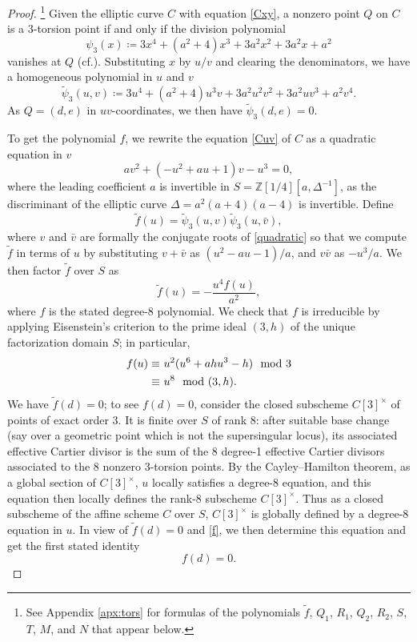 \documentclass{gtpart}
\theoremstyle{definition}
\theoremstyle{remark}
\newcommand{\mb}[1]{\mathbb{#1}}
\newcommand{\cf}{cf.\thinspace}
\newcommand{\BZ}{{\mb Z}}
\newcommand{\Tf}{\widetilde{f}}
\newcommand{\TP}{\widetilde{\psi}}
\newcommand{\md}{~~{\rm mod}~}
\begin{document}
\begin{proof}
 \footnote{See Appendix \ref{apx:tors} for formulas of the polynomials $\Tf$, $Q_1$, $R_1$, $Q_2$, $R_2$, $S$, $T$, $M$, and $N$ that appear below.  }
 Given the elliptic curve $C$ with equation \eqref{Cxy}, a nonzero point $Q$ on $C$ is a 3-torsion point if and only if the division polynomial 
 \[
  \psi_3 (x) \coloneqq 3x^4 + (a^2 + 4) x^3 + 3a^2 x^2 + 3a^2 x + a^2 
 \]
 vanishes at $Q$ (\cf \cite[Exercise 3.7f]{AEC}).  Substituting $x$ by $u/v$ and clearing the denominators, we have a homogeneous polynomial in $u$ and $v$ 
 \[
  \TP_3(u,v) \coloneqq 3u^4 + (a^2 + 4) u^3 v + 3a^2 u^2 v^2 + 3a^2 u v^3 + a^2 v^4.  
 \]
 As $Q = (d,e)$ in $uv$-coordinates, we then have $\TP_3(d,e) = 0$.  

 To get the polynomial $f$, we rewrite the equation \eqref{Cuv} of $C$ as a quadratic equation in $v$ 
 \begin{equation}
 \label{quadratic}
  a v^2 + (-u^2 + a u + 1) v - u^3 = 0, 
 \end{equation}
 where the leading coefficient $a$ is invertible in $S = \BZ [1/4] [a, \Delta^{-1}]$, as the discriminant of the elliptic curve $\Delta = a^2 (a + 4) (a - 4)$ is invertible.  
 Define 
 \[
  \Tf(u) = \TP_3(u,v) \TP_3(u,\bar{v}), 
 \]
 where $v$ and $\bar{v}$ are formally the conjugate roots of \eqref{quadratic} 
 so that we compute $\Tf$ in terms of $u$ by substituting $v + \bar{v}$ as $(u^2 - a u - 1) / a$, and $v \bar{v}$ as $-u^3 / a$.  
 We then factor $\Tf$ over $S$ as 
 \begin{equation}
 \label{f}
  \Tf(u) = -\frac{u^4 f(u)}{a^2}, 
 \end{equation}
 where $f$ is the stated degree-8 polynomial.  
 We check that $f$ is irreducible by applying Eisenstein's criterion to the prime ideal $(3,h)$ of the unique factorization domain $S$; in particular, 
 \begin{equation}
 \label{fmod3}
 \begin{split}
  f(u) \equiv & ~ u^2 (u^6 + a h u^3 - h) \md 3 \\
       \equiv & ~ u^8 \md (3,h).  
 \end{split}
 \end{equation}
 We have $\Tf(d) = 0$; to see $f(d) = 0$, consider the closed subscheme $C[3]^\times$ of points of exact order 3.  
 It is finite over $S$ of rank 8: after suitable base change (say over a geometric point which is not the supersingular locus), 
 its associated effective Cartier divisor is the sum of the 8 degree-1 effective Cartier divisors associated to the 8 nonzero 3-torsion points.  
 By the Cayley--Hamilton theorem, as a global section of $C[3]^\times$, $u$ locally satisfies a degree-8 equation, 
 and this equation then locally defines the rank-8 subscheme $C[3]^\times$.  
 Thus as a closed subscheme of the affine scheme $C$ over $S$, $C[3]^\times$ is globally defined by a degree-8 equation in $u$.  
 In view of $\Tf(d) = 0$ and \eqref{f}, we then determine this equation and get the first stated identity 
 \[
  f(d) = 0.  
 \]


\end{proof}
\end{document}
